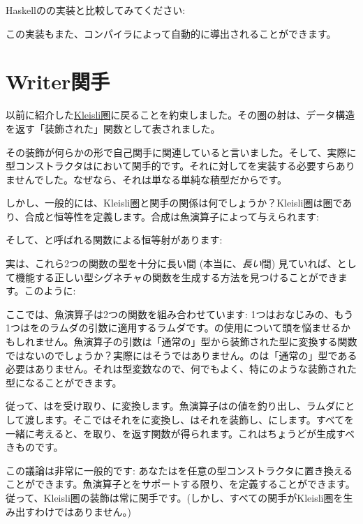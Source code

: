 Haskellのの実装と比較してみてください: 

この実装もまた、コンパイラによって自動的に導出されることができます。

\section{Writer関手}

以前に紹介した\hyperref[kleisli-categories]{Kleisli圏}に戻ることを約束しました。その圏の射は、データ構造を返す「装飾された」関数として表されました。

その装飾が何らかの形で自己関手に関連していると言いました。そして、実際に型コンストラクタはにおいて関手的です。それに対してを実装する必要すらありませんでした。なぜなら、それは単なる単純な積型だからです。

しかし、一般的には、Kleisli圏と関手の関係は何でしょうか？Kleisli圏は圏であり、合成と恒等性を定義します。合成は魚演算子によって与えられます: 

そして、と呼ばれる関数による恒等射があります: 

実は、これら2つの関数の型を十分に長い間 (本当に、\emph{長い}間) 見ていれば、として機能する正しい型シグネチャの関数を生成する方法を見つけることができます。このように: 

ここでは、魚演算子は2つの関数を組み合わせています: 1つはおなじみの、もう1つはをのラムダの引数に適用するラムダです。の使用について頭を悩ませるかもしれません。魚演算子の引数は「通常の」型から装飾された型に変換する関数ではないのでしょうか？実際にはそうではありません。のは「通常の」型である必要はありません。それは型変数なので、何でもよく、特にのような装飾された型になることができます。

従って、はを受け取り、に変換します。魚演算子はの値を釣り出し、ラムダにとして渡します。そこではそれをに変換し、はそれを装飾し、にします。すべてを一緒に考えると、を取り、を返す関数が得られます。これはちょうどが生成すべきものです。

この議論は非常に一般的です: あなたはを任意の型コンストラクタに置き換えることができます。魚演算子とをサポートする限り、を定義することができます。従って、Kleisli圏の装飾は常に関手です。(しかし、すべての関手がKleisli圏を生み出すわけではありません。) 

